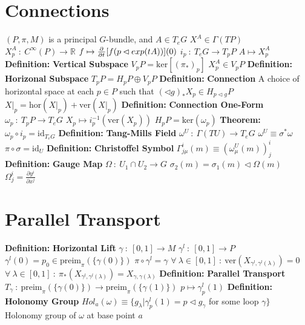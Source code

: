 \documentclass[14pt]{extarticle}
\def\Definition{{\color{blue} \textbf{Definition:} }}
\def\Theorem{{\color{red} \textbf{Theorem:} }}
\begin{document}
\begin{outline}
	\section*{Connections}
		\1	$(P,\pi,M)$ is a principal $G$-bundle, and $A \in T_eG$
			\2	$X^A \in \Gamma(TP)$
			\2	$X^A_p~:~C^{\infty}(P) \rightarrow \mathbb{R}$
			\2	$f \mapsto \pd{}{t}[f(p \lhd exp(tA))](0)$
			\2	$i_p~:~T_eG \rightarrow T_pP$
			\2	$A \mapsto X^A_p$
		\1	\Definition \textbf{Vertical Subspace}
			\2	$V_pP = \text{ker}[(\pi_*)_p]$
			\2	$X^A_p \in V_pP$ 
		\1	\Definition \textbf{Horizonal Subspace}
			\2	$T_pP = H_pP \oplus V_pP$
		\1	\Definition \textbf{Connection}
			\2	A choice of horizontal space at each $p \in P$ such that
				\3	$(\lhd g)_*X_p \in H_{p \lhd g}P$
				\3	$X|_p = \text{hor}(X|_p) + \text{ver}(X|_p)$
		\1	\Definition \textbf{Connection One-Form}
			\2	$\omega_p~:~T_pP \rightarrow T_eG$
			\2	$X_p \mapsto i^{-1}_p (\text{ver}(X_p))$
			\2	$H_pP = \text{ker}(\omega_p)$
		\1	\Theorem $\omega_p \circ i_p = \text{id}_{T_eG}$
		\1	\Definition \textbf{Tang-Mills Field}
			\2	$\omega^U~:~\Gamma(TU) \rightarrow T_eG$
			\2	$\omega^U \equiv \sigma^*\omega$
				\3	$\pi \circ \sigma = \text{id}_U$
			\2	\Definition \textbf{Christoffel Symbol}
				\3	$\Gamma^i_{j\mu}(m) \equiv (\omega^U_{\mu}(m))^i_j$
		\1	\Definition \textbf{Gauge Map}
			\2	$\Omega~:~U_1 \cap U_2 \rightarrow G$
			\2	$\sigma_2(m) = \sigma_1(m) \lhd \Omega(m)$
			\2	$\Omega^i_j = \frac{\partial y^i}{\partial x^j}$
	
	\section*{Parallel Transport}
		\1	\Definition \textbf{Horizontal Lift}
			\2	$\gamma~:~[0,1] \rightarrow M$
			\2	$\gamma^{l}~:~[0,1] \rightarrow P$
			\2	$\gamma^{l}(0) = p_0 \in \text{preim}_{\pi}(\{\gamma(0)\})$
				\3	$\pi \circ \gamma^l = \gamma$
				\3	$\forall~\lambda \in [0,1]~:~\text{ver}(X_{\gamma^l,\gamma^l(\lambda)}) = 0$
				\3	$\forall~\lambda \in [0,1]~:~\pi_*(X_{\gamma^l,\gamma^l(\lambda)}) = X_{\gamma,\gamma(\lambda)}$
		\1	\Definition \textbf{Parallel Transport}
			\2	$T_{\gamma}~:~\text{preim}_{\pi}(\{\gamma(0)\}) \rightarrow \text{preim}_{\pi}(\{\gamma(1)\})$
			\2	$p \mapsto \gamma^l_p(1)$
		\1	\Definition \textbf{Holonomy Group}
			\2	$Hol_a(\omega) \equiv \{g_{\lambda} | \gamma^l_p(1) = p \lhd g_{\gamma}$
					for some loop $\gamma\}$
			\2	Holonomy group of $\omega$ at base point $a$
	

\end{outline}
\end{document}
